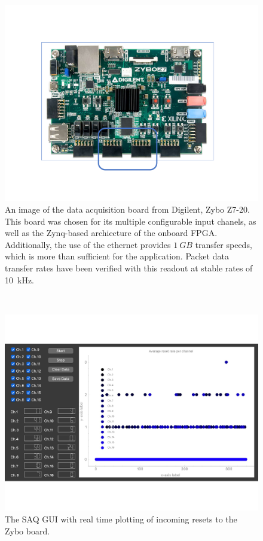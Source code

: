 \begin{figure}[]
\centering
\includegraphics[width=\textwidth]{images/SAQ_zybo_daq.pdf}
\caption{An image of the data acquisition board from Digilent, Zybo Z7-20. 
This board was chosen for its multiple configurable input chanels, as well as the Zynq-based archiecture of the onboard FPGA.
Additionally, the use of the ethernet provides $1~\unit{GB}$ transfer speeds, which is more than sufficient for the application.
Packet data transfer rates have been verified with this readout at stable rates of 10~\unit{kHz}.
}
\end{figure}~\label{fig:saq_zybo}

\begin{figure}[]
\centering
\includegraphics[width=\textwidth]{images/SAQ_gui_resets.pdf}
\caption{The SAQ GUI with real time plotting of incoming resets to the Zybo board.}
\end{figure}~\label{fig:saq_gui}



